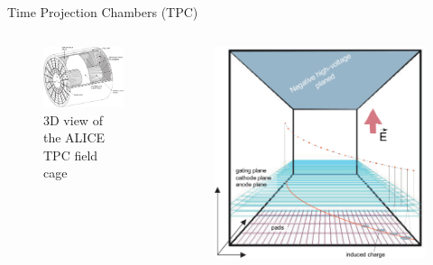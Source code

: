 \documentclass{beamer}
\begin{document}
\begin{frame}{Time Projection Chambers (TPC)}
\begin{columns}
\begin{column}{.5\textwidth}
\begin{figure}
  \includegraphics[width=\textwidth]{plots/ALICE_TPC.pdf}
  \caption{3D view of the ALICE TPC field cage}
\end{figure}
\end{column}
\begin{column}{.5\textwidth}
\begin{figure}
  \includegraphics[width=\textwidth]{plots/TPC_cartoon.pdf}
\end{figure}
\end{column}
\end{columns}
\end{frame}
\end{document}
